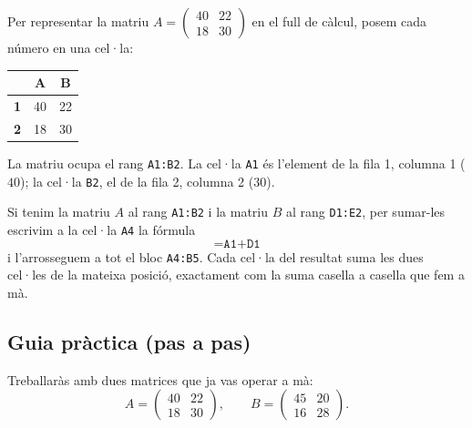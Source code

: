 \begin{exemple}
Per representar la matriu $A=\begin{pmatrix} 40 & 22 \\ 18 & 30 \end{pmatrix}$
en el full de càlcul, posem cada número en una cel·la:
\begin{center}
\begin{tabular}{c|cc}
 & \textbf{A} & \textbf{B} \\
\hline
\textbf{1} & 40 & 22 \\
\textbf{2} & 18 & 30 \\
\end{tabular}
\end{center}
La matriu ocupa el rang \texttt{A1:B2}. La cel·la \texttt{A1} és l'element de la
fila 1, columna 1 ($40$); la cel·la \texttt{B2}, el de la fila 2, columna 2 ($30$).
\end{exemple}

\begin{exemple}
Si tenim la matriu $A$ al rang \texttt{A1:B2} i la matriu $B$ al rang
\texttt{D1:E2}, per sumar-les escrivim a la cel·la \texttt{A4} la fórmula
\[
\texttt{=A1+D1}
\]
i l'arrosseguem a tot el bloc \texttt{A4:B5}. Cada cel·la del resultat suma les
dues cel·les de la mateixa posició, exactament com la suma casella a casella que
fem a mà.
\end{exemple}

\subsection{Guia pràctica (pas a pas)}

Treballaràs amb dues matrices que ja vas operar a mà:
\[
A=\begin{pmatrix} 40 & 22 \\ 18 & 30 \end{pmatrix},\qquad
B=\begin{pmatrix} 45 & 20 \\ 16 & 28 \end{pmatrix}.
\]

